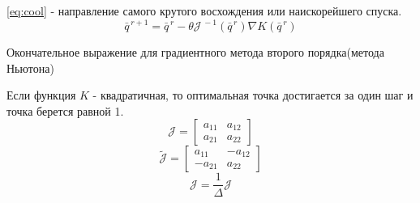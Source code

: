 \documentclass[12pt,a5paper]{scrbook}
\begin{document}
  \par
  \ref{eq:cool} - направление самого крутого восхождения или наискорейшего спуска.
  \begin{equation}
    \bar{q}^{\,r+1} = \bar{q}^{\,r} - \theta\mathcal{J}^{\,-1}(\bar{q}^{\,r})\nabla K(\bar{q}^{\,r})
  \end{equation}
  \par
  Окончательное выражение для градиентного метода второго порядка(метода Ньютона)
  \par
  Если функция $K$ - квадратичная, то оптимальная точка достигается за один шаг и точка берется равной 1.
  $$
    \mathcal{J} =
    \begin{bmatrix}
      a_{11} & a_{12}\\
      a_{21} & a_{22}
    \end{bmatrix}
  $$
  $$
    \tilde{\mathcal{J}} =
    \begin{bmatrix}
      a_{11} & -a_{12}\\
      -a_{21} & a_{22}
    \end{bmatrix}
  $$
  $$
    \mathcal{J} = \frac{1}{\Delta}\mathcal{J}
  $$
\end{document}
